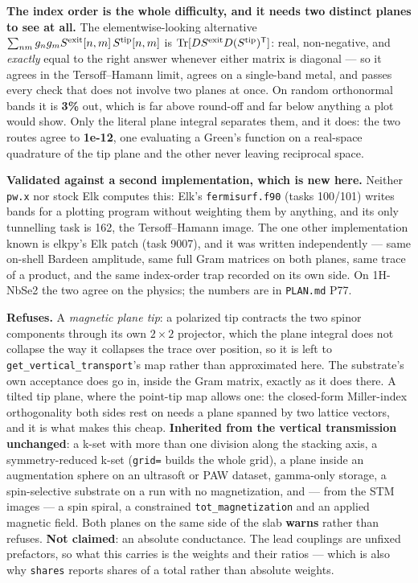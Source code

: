 \documentclass[11pt,a4paper]{article}
\newcommand{\code}[1]{\texttt{\small #1}}
\begin{document}
\textbf{The index order is the whole difficulty, and it needs two distinct
planes to see at all.} The elementwise-looking alternative
$\sum_{nm} g_n g_m S^{\rm exit}[n,m]\, S^{\rm tip}[n,m]$ is
$\mathrm{Tr}[D S^{\rm exit} D (S^{\rm tip})^{\mathsf T}]$: real, non-negative,
and \emph{exactly} equal to the right answer whenever either matrix is diagonal
--- so it agrees in the Tersoff--Hamann limit, agrees on a single-band metal,
and passes every check that does not involve two planes at once. On random
orthonormal bands it is \textbf{3\%} out, which is far above round-off and far
below anything a plot would show. Only the literal plane integral separates
them, and it does: the two routes agree to \textbf{1e-12}, one evaluating a
Green's function on a real-space quadrature of the tip plane and the other never
leaving reciprocal space.

\textbf{Validated against a second implementation, which is new here.} Neither
\code{pw.x} nor stock Elk computes this: Elk's \code{fermisurf.f90} (tasks
100/101) writes bands for a plotting program without weighting them by
anything, and its only tunnelling task is 162, the Tersoff--Hamann image. The
one other implementation known is elkpy's Elk patch (task 9007), and it was
written independently --- same on-shell Bardeen amplitude, same full Gram
matrices on both planes, same trace of a product, and the same index-order trap
recorded on its own side. On 1H-NbSe2 the two agree on the physics; the numbers
are in \code{PLAN.md} P77.

\begin{refuses}
\textbf{Refuses.} A \emph{magnetic plane tip}: a polarized tip contracts the two
spinor components through its own $2\times2$ projector, which the plane integral
does not collapse the way it collapses the trace over position, so it is left to
\code{get\_vertical\_transport}'s map rather than approximated here. The
substrate's own acceptance does go in, inside the Gram matrix, exactly as it
does there. A tilted tip plane, where the point-tip map allows one: the
closed-form Miller-index orthogonality both sides rest on needs a plane spanned
by two lattice vectors, and it is what makes this cheap.
\textbf{Inherited from the vertical transmission unchanged}: a k-set with more
than one division along the stacking axis, a symmetry-reduced k-set
(\code{grid=} builds the whole grid), a plane inside an augmentation sphere on
an ultrasoft or PAW dataset, gamma-only storage, a spin-selective substrate on a
run with no magnetization, and --- from the STM images --- a spin spiral, a
constrained \code{tot\_magnetization} and an applied magnetic field. Both planes
on the same side of the slab \textbf{warns} rather than refuses.
\textbf{Not claimed}: an absolute conductance. The lead couplings are unfixed
prefactors, so what this carries is the weights and their ratios --- which is
also why \code{shares} reports shares of a total rather than absolute weights.
\end{refuses}
\end{document}
